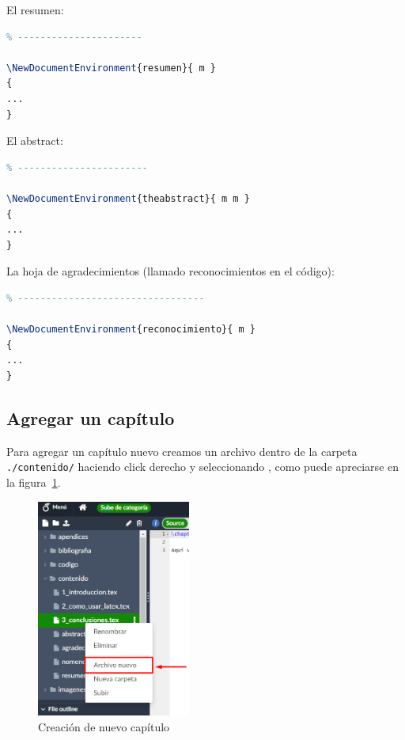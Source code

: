 El resumen:

\footnotesize
\begin{lstlisting}[language=TeX, numbers=none]
% 3. Formato del resumen
% ----------------------

\NewDocumentEnvironment{resumen}{ m }
{
...
}
\end{lstlisting}
\normalsize

El abstract:

\footnotesize
\begin{lstlisting}[language=TeX, numbers=none]
% 4. Formato del abstract
% -----------------------

\NewDocumentEnvironment{theabstract}{ m m }
{
...
}
\end{lstlisting}
\normalsize

La hoja de agradecimientos (llamado reconocimientos en el código):

\footnotesize
\begin{lstlisting}[language=TeX, numbers=none]
% 5. Formato de los reconocimientos
% ---------------------------------

\NewDocumentEnvironment{reconocimiento}{ m }
{
...
}
\end{lstlisting}
\normalsize


\clearpage
\subsection{Agregar un capítulo}

Para agregar un capítulo nuevo creamos un archivo dentro de la carpeta \texttt{./contenido/} haciendo click derecho y seleccionando , como puede apreciarse en la figura~\ref{F:crear_nuevo_capitulo}.

\begin{figure}[ht]
  \centering
  \includegraphics[width=0.45\textwidth]{./imagenes/crear_nuevo_capitulo.png}
  \caption{Creación de nuevo capítulo}
  \label{F:crear_nuevo_capitulo}
\end{figure}

